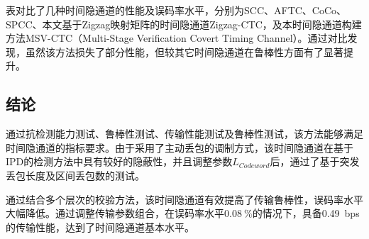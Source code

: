 
表对比了几种时间隐通道的性能及误码率水平，分别为SCC、AFTC、CoCo、SPCC、本文基于Zigzag映射矩阵的时间隐通道Zigzag-CTC，及本时间隐通道构建方法MSV-CTC（Multi-Stage Verification Covert Timing Channel）。通过对比发现，虽然该方法损失了部分性能，但较其它时间隐通道在鲁棒性方面有了显著提升。

\subsection{结论}
\label{chap:hash:result:conclusion}

通过抗检测能力测试、鲁棒性测试、传输性能测试及鲁棒性测试，该方法能够满足时间隐通道的指标要求。由于采用了主动丢包的调制方式，该时间隐通道在基于IPD的检测方法中具有较好的隐蔽性，并且调整参数$L_{Codeword}$后，通过了基于突发丢包长度及区间丢包数的测试。

通过结合多个层次的校验方法，该时间隐通道有效提高了传输鲁棒性，误码率水平大幅降低。通过调整传输参数组合，在误码率水平{$0.08\ \%$}的情况下，具备{0.49\ bps}的传输性能，达到了时间隐通道基本水平。